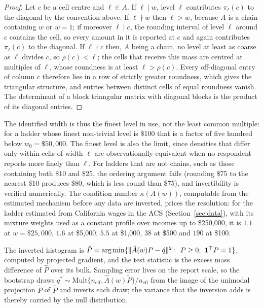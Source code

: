 \begin{proof}
Let $c$ be a cell centre and $\ell\in A$. If $\ell\mid w$, level $\ell$ contributes $\pi_\ell(c)$ to the diagonal by the convention above. If $\ell\nmid w$ then $\ell>w$, because $A$ is a chain containing $w$ or $w=1$; if moreover $\ell\mid c$, the rounding interval of level $\ell$ around $c$ contains the cell, so every amount in it is reported at $c$ and again contributes $\pi_\ell(c)$ to the diagonal. If $\ell\nmid c$ then, $A$ being a chain, no level at least as coarse as $\ell$ divides $c$, so $\rho(c)<\ell$; the cells that receive this mass are centred at multiples of $\ell$, whose roundness is at least $\ell>\rho(c)$. Every off-diagonal entry of column $c$ therefore lies in a row of strictly greater roundness, which gives the triangular structure, and entries between distinct cells of equal roundness vanish. The determinant of a block triangular matrix with diagonal blocks is the product of its diagonal entries.
\end{proof}

The identified width is thus the finest level in use, not the least common multiple: for a ladder whose finest non-trivial level is \$100 that is a factor of five hundred below $w_0=\$50{,}000$. The finest level is also the limit, since densities that differ only within cells of width $\ell$ are observationally equivalent when no respondent reports more finely than $\ell$. For ladders that are not chains, such as those containing both \$10 and \$25, the ordering argument fails (rounding \$75 to the nearest \$10 produces \$80, which is less round than \$75), and invertibility is verified numerically. The condition number $\kappa(A(w))$, computable from the estimated mechanism before any data are inverted, prices the resolution: for the ladder estimated from California wages in the ACS (Section~\ref{sec:data}), with its mixture weights used as a constant profile over incomes up to \$250{,}000, it is $1.1$ at $w=\$25{,}000$, $1.6$ at \$5{,}000, $5.5$ at \$1{,}000, $38$ at \$500 and $190$ at \$100.

The inverted histogram is $\hat P=\operatorname*{arg\,min}\{\|\hat A(w)P-\hat q\|^2:\ P\ge0,\ \mathbf 1^\top P=1\}$, computed by projected gradient, and the test statistic is the excess mass difference of $\hat P$ over its bulk. Sampling error lives on the report scale, so the bootstrap draws $q^\ast\sim\mathrm{Mult}\{n_{\mathrm{eff}},\hat A(w)\tilde P\}/n_{\mathrm{eff}}$ from the image of the unimodal projection $\tilde P$ of $\hat P$ and inverts each draw; the variance that the inversion adds is thereby carried by the null distribution.


